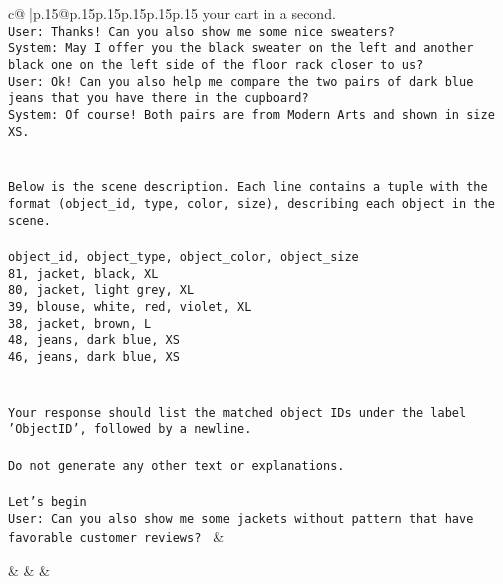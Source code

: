\documentclass{article}
\begin{document}
{\begin{supertabular}{c@{$\;$}|p{.15\linewidth}@{}p{.15\linewidth}p{.15\linewidth}p{.15\linewidth}p{.15\linewidth}p{.15\linewidth}}
{{{your cart in a second.\\ \tt User: Thanks! Can you also show me some nice sweaters?\\ \tt System: May I offer you the black sweater on the left  and another black one on the left side  of the floor rack closer to us?\\ \tt User: Ok! Can you also help me compare the two pairs of dark blue jeans that you have there in the cupboard?\\ \tt System: Of course! Both pairs are from Modern Arts  and shown in size XS.\\ \tt \\ \tt \\ \tt Below is the scene description. Each line contains a tuple with the format (object_id, type, color, size), describing each object in the scene.\\ \tt \\ \tt object_id, object_type, object_color, object_size\\ \tt 81, jacket, black, XL\\ \tt 80, jacket, light grey, XL\\ \tt 39, blouse, white, red, violet, XL\\ \tt 38, jacket, brown, L\\ \tt 48, jeans, dark blue, XS\\ \tt 46, jeans, dark blue, XS\\ \tt \\ \tt \\ \tt Your response should list the matched object IDs under the label 'ObjectID', followed by a newline.\\ \tt \\ \tt Do not generate any other text or explanations.\\ \tt \\ \tt Let's begin\\ \tt User: Can you also show me some jackets without pattern that have favorable customer reviews? 
	  } 
	   } 
	   } 
	 & \\ 
 

    \theutterance {}  

    &  
	 & & \\ 
 


\end{supertabular}}
\end{document}
